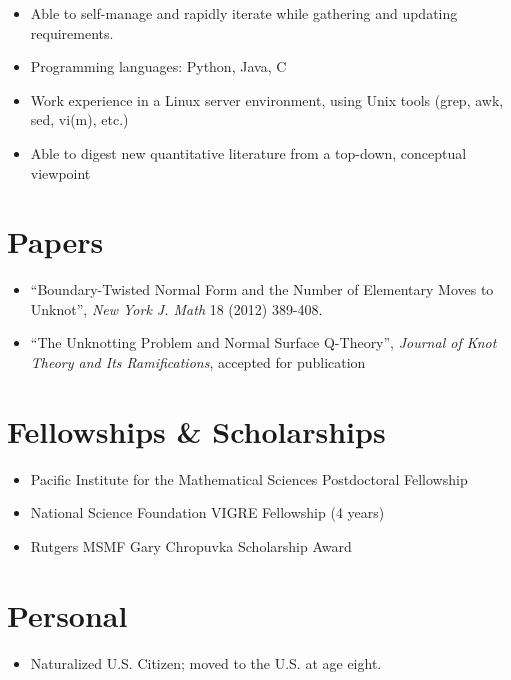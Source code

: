 \documentclass[margin]{res}
\def\tightlist{}
\begin{document}
\begin{resume}
\begin{itemize}
\tightlist
\item
  Able to self-manage and rapidly iterate while gathering and updating
  requirements.
\item
  Programming languages: {Python}, {Java}, {C}
\item
  Work experience in a Linux server environment, using Unix tools (grep,
  awk, sed, vi(m), etc.)
\item
  Able to digest new quantitative literature from a top-down, conceptual
  viewpoint
\end{itemize}

\section{Papers}\label{papers}

\begin{itemize}
\tightlist
\item
  ``Boundary-Twisted Normal Form and the Number of Elementary Moves to
  Unknot'', \emph{New York J. Math} 18 (2012) 389-408.
\item
  ``The Unknotting Problem and Normal Surface Q-Theory'', \emph{Journal
  of Knot Theory and Its Ramifications}, accepted for publication
\end{itemize}

\section{Fellowships \& Scholarships}\label{fellowships-scholarships}

\begin{itemize}
\tightlist
\item
  Pacific Institute for the Mathematical Sciences Postdoctoral
  Fellowship
\item
  National Science Foundation VIGRE Fellowship (4 years)
\item
  Rutgers MSMF Gary Chropuvka Scholarship Award
\end{itemize}

\section{Personal}\label{personal}

\begin{itemize}
\tightlist
\item
  Naturalized U.S. Citizen; moved to the U.S. at age eight.
\end{itemize}

\end{resume}
\end{document}
